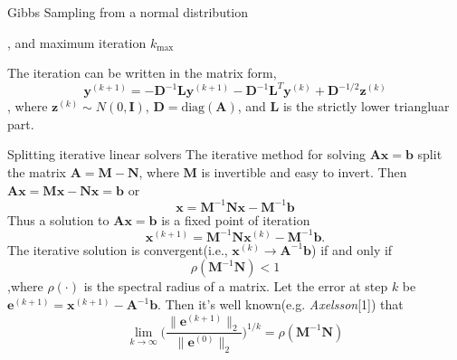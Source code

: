 \documentclass[10pt]{beamer}
\begin{document}
\begin{frame}{Gibbs Sampling from a normal distribution}
    \begin{algorithm}[H]
        , and maximum iteration $k_{\max}$ \\
        \caption{Component-sweep Gibbs sampling using a precision matrix $\mathbf{A}$}
    \end{algorithm}

    The iteration can be written in the matrix form,
    \begin{equation}
        \mathbf{y}^{(k+1)} = -\mathbf{D}^{-1}\mathbf{L}\mathbf{y}^{(k+1)} - \mathbf{D}^{-1}\mathbf{L}^T\mathbf{y}^{(k)} + \mathbf{D}^{-1/2}\mathbf{z}^{(k)}
    \end{equation}
    , where $\mathbf{z}^{(k)} \sim N(0, \mathbf{I})$, $\mathbf{D} = \text{diag}(\mathbf{A})$, and 
    $\mathbf{L}$ is the strictly lower triangluar part.
\end{frame}

\begin{frame}{Splitting iterative linear solvers}
The iterative method for solving $\mathbf{A}\mathbf{x}=\mathbf{b}$ split the matrix 
$\mathbf{A} = \mathbf{M} - \mathbf{N}$, where $\mathbf{M}$ is invertible and easy to invert.
Then $\mathbf{A}\mathbf{x} = \mathbf{M}\mathbf{x} - \mathbf{N}\mathbf{x} = \mathbf{b}$ or
$$
    \mathbf{x} = \mathbf{M}^{-1}\mathbf{N}\mathbf{x} - \mathbf{M}^{-1}\mathbf{b}
$$
Thus a solution to $\mathbf{A}\mathbf{x}=\mathbf{b}$ is a fixed point of iteration
    \begin{equation}
        \mathbf{x}^{(k+1)} = \mathbf{M}^{-1}\mathbf{N}\mathbf{x}^{(k)} - \mathbf{M}^{-1}\mathbf{b}.
    \end{equation}
The iterative solution is convergent(i.e., $\mathbf{x}^{(k)} \rightarrow \mathbf{A}^{-1}\mathbf{b}$)
if and only if 
$$\mathcal{\rho}(\mathbf{M}^{-1}\mathbf{N}) < 1$$ 
,where $\mathcal{\rho}(\cdot)$ is the spectral radius of a matrix. 
Let the error at step $k$ be $\mathbf{e}^{(k+1)} =\mathbf{x}^{(k+1)} - \mathbf{A}^{-1}\mathbf{b}.$
Then it's well known(e.g. \emph{Axelsson}[1]) that
    \begin{equation}
        \lim_{k \to \infty}
        \bigg(\frac{\|\mathbf{e}^{(k+1)}\|_2}{\|\mathbf{e}^{(0)}\|_2}\bigg)^{1/k}  
        = \mathcal{\rho}(\mathbf{M}^{-1}\mathbf{N})
    \end{equation}
\end{frame}
\end{document}
